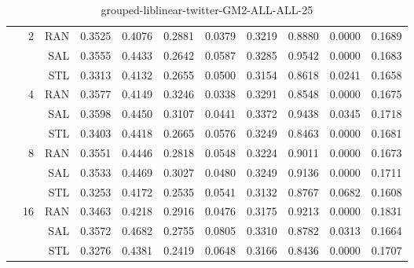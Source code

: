\begin{center}
\begin{table}[htbp]
\begin{center}
\begin{tabular}{ | r | r | r | r | r | r | r | r | r | r | r |}
 & \multirow{3}{*}{2} & RAN & 0.3525 & 0.4076 & 0.2881 & 0.0379 & 0.3219 & 0.8880 & 0.0000 & 0.1689\\ \cline{3-11}
 &   & SAL & 0.3555 & 0.4433 & 0.2642 & 0.0587 & 0.3285 & 0.9542 & 0.0000 & 0.1683\\ \cline{3-11}
 &   & STL & 0.3313 & 0.4132 & 0.2655 & 0.0500 & 0.3154 & 0.8618 & 0.0241 & 0.1658\\ \cline{2-11}
 & \multirow{3}{*}{4} & RAN & 0.3577 & 0.4149 & 0.3246 & 0.0338 & 0.3291 & 0.8548 & 0.0000 & 0.1675\\ \cline{3-11}
 &   & SAL & 0.3598 & 0.4450 & 0.3107 & 0.0441 & 0.3372 & 0.9438 & 0.0345 & 0.1718\\ \cline{3-11}
 &   & STL & 0.3403 & 0.4418 & 0.2665 & 0.0576 & 0.3249 & 0.8463 & 0.0000 & 0.1681\\ \cline{2-11}
 & \multirow{3}{*}{8} & RAN & 0.3551 & 0.4446 & 0.2818 & 0.0548 & 0.3224 & 0.9011 & 0.0000 & 0.1673\\ \cline{3-11}
 &   & SAL & 0.3533 & 0.4469 & 0.3027 & 0.0480 & 0.3249 & 0.9136 & 0.0000 & 0.1711\\ \cline{3-11}
 &   & STL & 0.3253 & 0.4172 & 0.2535 & 0.0541 & 0.3132 & 0.8767 & 0.0682 & 0.1608\\ \cline{2-11}
 & \multirow{3}{*}{16} & RAN & 0.3463 & 0.4218 & 0.2916 & 0.0476 & 0.3175 & 0.9213 & 0.0000 & 0.1831\\ \cline{3-11}
 &   & SAL & 0.3572 & 0.4682 & 0.2755 & 0.0805 & 0.3310 & 0.8782 & 0.0313 & 0.1664\\ \cline{3-11}
 &   & STL & 0.3276 & 0.4381 & 0.2419 & 0.0648 & 0.3166 & 0.8436 & 0.0000 & 0.1707\\ \cline{2-11}
\hline
\end{tabular}
\caption{grouped-liblinear-twitter-GM2-ALL-ALL-25}
\end{center}
 \end{table}
\end{center}

